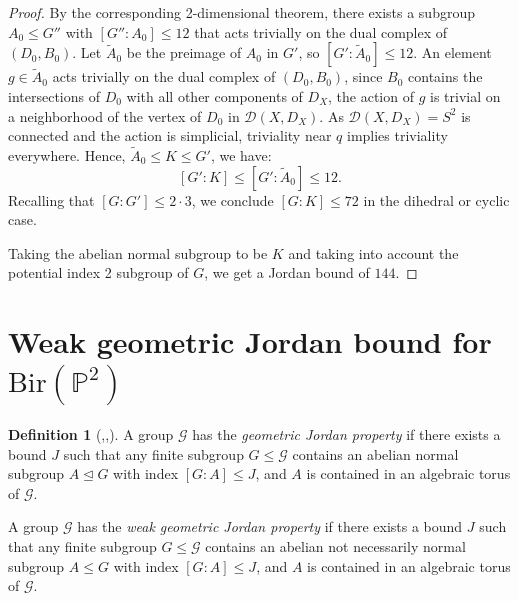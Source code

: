 \documentclass[a4paper,12pt,oneside]{amsart}
\numberwithin{equation}{section}
\theoremstyle{definition}
\newtheorem{definition}[theorem]{Definition}
\theoremstyle{remark}
\newcommand{\Ptwo}{\mathbb{P}^2}
\newcommand{\Bir}{\mathrm{Bir}}
\begin{document}
\begin{proof}
By the corresponding 2-dimensional theorem, there exists a subgroup \( A_0 \leqslant G'' \) with \( [G'' : A_0] \leq 12 \) that acts trivially on the dual complex of $(D_0,B_0)$. Let \( \tilde{A}_0 \) be the preimage of \( A_0 \) in \( G' \), so \( [G' : \tilde{A}_0] \leq 12 \). An element \( g \in \tilde{A}_0 \) acts trivially on the dual complex of \((D_0, B_0 )\), since \( B_0 \) contains the intersections of \( D_0 \) with all other components of \(D_X \), the action of \( g \) is trivial on a neighborhood of the vertex of $D_0$ in \( \mathcal{D}(X, D_X) \). As \( \mathcal{D}(X, D_X) = S^2 \) is connected and the action is simplicial, triviality near \( q \) implies triviality everywhere. Hence, \( \tilde{A}_0 \leqslant K  \leqslant G' \), we have:
\[
[G' : K] \leq [G' : \tilde{A}_0] \leq 12.
\]
Recalling that \( [G : G'] \leq 2\cdot 3 \), we conclude \( [G : K] \leq 72 \) in the dihedral or cyclic case.

Taking the abelian normal subgroup to be $K$ and taking into account the potential index 2 subgroup of $G$, we get a Jordan bound of $144$.
\end{proof}











\section{Weak geometric Jordan bound for $\Bir(\Ptwo)$}

\begin{definition}[{\cite[Section 3]{moraga23},\cite[Definition 1.2.1]{prok17},\cite[Conjecture 8.5]{moraga}}]
A group $\mathcal{G}$ has the \emph{geometric Jordan property} if there exists a bound $J$ such that any finite subgroup $G \leqslant \mathcal{G}$ contains an abelian normal subgroup $A \trianglelefteq G$ with index $[G:A] \leq J$, and $A$ is contained in an algebraic torus of $\mathcal{G}$.

A group $\mathcal{G}$ has the \emph{weak geometric Jordan property} if there exists a bound $J$ such that any finite subgroup $G \leqslant \mathcal{G}$ contains an abelian not necessarily normal subgroup $A \leqslant G$ with index $[G:A] \leq J$, and $A$ is contained in an algebraic torus of $\mathcal{G}$.
\end{definition}
\end{document}
